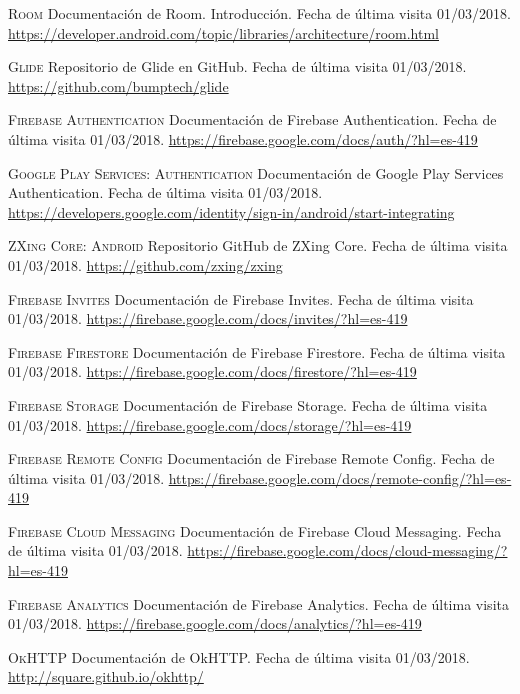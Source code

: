 \documentclass[twoside]{report}
\begin{document}
\begin{thebibliography}{a}
 \textsc{Room} 
Documentación de Room. Introducción. Fecha de última visita 01/03/2018. \url{https://developer.android.com/topic/libraries/architecture/room.html}

 \textsc{Glide} 
Repositorio de Glide en GitHub. Fecha de última visita 01/03/2018. \url{https://github.com/bumptech/glide}

 \textsc{Firebase Authentication} 
Documentación de Firebase Authentication. Fecha de última visita 01/03/2018. \url{https://firebase.google.com/docs/auth/?hl=es-419}

 \textsc{Google Play Services: Authentication} 
Documentación de Google Play Services Authentication. Fecha de última visita 01/03/2018. \url{https://developers.google.com/identity/sign-in/android/start-integrating}

 \textsc{ZXing Core: Android} 
Repositorio GitHub de ZXing Core. Fecha de última visita 01/03/2018. \url{https://github.com/zxing/zxing}

 \textsc{Firebase Invites} 
Documentación de Firebase Invites. Fecha de última visita 01/03/2018. \url{https://firebase.google.com/docs/invites/?hl=es-419}

 \textsc{Firebase Firestore} 
Documentación de Firebase Firestore. Fecha de última visita 01/03/2018. \url{https://firebase.google.com/docs/firestore/?hl=es-419}

 \textsc{Firebase Storage} 
Documentación de Firebase Storage. Fecha de última visita 01/03/2018. \url{https://firebase.google.com/docs/storage/?hl=es-419}


 \textsc{Firebase Remote Config} 
Documentación de Firebase Remote Config. Fecha de última visita 01/03/2018. \url{https://firebase.google.com/docs/remote-config/?hl=es-419}

 \textsc{Firebase Cloud Messaging} 
Documentación de Firebase Cloud Messaging. Fecha de última visita 01/03/2018. \url{https://firebase.google.com/docs/cloud-messaging/?hl=es-419}

 \textsc{Firebase Analytics} 
Documentación de Firebase Analytics. Fecha de última visita 01/03/2018. \url{https://firebase.google.com/docs/analytics/?hl=es-419}

 \textsc{OkHTTP} 
Documentación de OkHTTP. Fecha de última visita 01/03/2018. \url{http://square.github.io/okhttp/}


\end{thebibliography}
\end{document}

